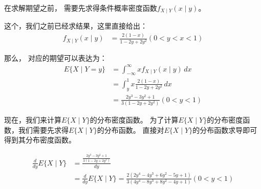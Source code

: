 \documentclass[a4,10pt]{ctexart}
\begin{document}
   \begin{qj}

在求解期望之前， 需要先求得条件概率密度函数$f_{X \mid Y}(x \mid y)$。

这个，我们之前已经求结果，这里直接给出：
\begin{align}
    f_{X \mid Y}(x \mid y) &= \frac{2(1-x)}{1-2y+2y^2} (0<y<x<1)
\end{align}


那么， 对应的期望可以表达为：
\begin{align}
    E\{X \mid Y=y\} &= \int_{-\infty}^\infty x f_{X \mid Y}(x \mid y) \, dx \\
    &= \int_{y}^1 x \frac{2(1-x)}{1-2y+2y^2} \, dx \\
    &=  \frac{2y^3-3y^2+1}{3(1-2y+2y^2)} (0<y<1)
\end{align}


现在，我们来计算$E\{X \mid Y\}$的分布密度函数。
为了计算$E\{X \mid Y\}$的分布密度函数，我们需要先求得$E\{X \mid Y\}$的分布函数。
直接对$E\{X \mid Y\}$的分布函数求导即可得到其分布密度函数。


\begin{align}
    \frac{d}{dy} E\{X \mid Y\} &= \frac{ \frac{2y^3-3y^2+1}{3(1-2y+2y^2)} }{dy} \\
    &= \frac{d}{dy} E\{X \mid Y\} = \frac{2(2y^4 - 4y^3 + 6y^2 - 5y + 1)}{3(4y^4 - 8y^3 + 8y^2 - 4y + 1)}
    (0 < y < 1 )
\end{align}


   \end{qj}
    





              

              
\end{document}
